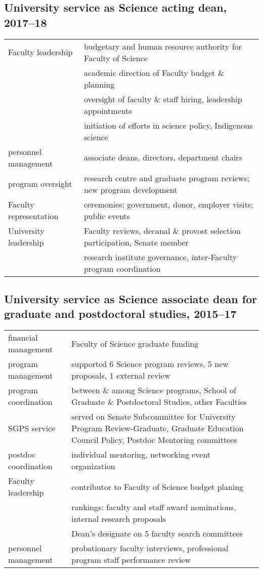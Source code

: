 \subsection{University service as Science acting dean, 2017--18}

\begin{tabularx}{\textwidth}{lX}
Faculty leadership & budgetary and human resource authority for Faculty of Science \\
& academic direction of Faculty budget \& planning   \\
& oversight of faculty \& staff hiring, leadership appointments \\
& initiation of efforts in science policy, Indigenous science \\
personnel management & associate deans, directors, department chairs \\
program oversight & research centre and graduate program reviews; new program development \\
Faculty representation & ceremonies; government, donor, employer visits; public events \\
University leadership  &  Faculty reviews, decanal \& provost selection participation, Senate member\\
 & research institute governance, inter-Faculty program coordination\\ 
\end{tabularx}

\subsection{University service as Science associate dean for graduate and postdoctoral studies, 2015--17}

\begin{tabularx}{\textwidth}{lX}
financial management & Faculty of Science graduate funding  \\
program management  & supported 6 Science program reviews,  5 new proposals, 1 external review \\
program coordination & between \& among Science programs, School of Graduate \& Postdoctoral Studies, other Faculties \\
SGPS  service &  served on Senate Subcommittee for University Program Review-Graduate, Graduate Education Council Policy, Postdoc Mentoring committees  \\
postdoc coordination & individual mentoring, networking event organization  \\ 
Faculty leadership & contributor to Faculty of Science budget planing  \\
& rankings: faculty and staff award nominations, internal research proposals  \\
& Dean's designate on 5 faculty search committees \\
personnel management & probationary faculty interviews, professional program staff performance review  \\
\end{tabularx}

